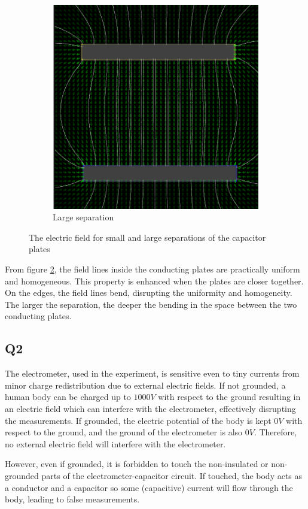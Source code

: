 \begin{figure}[H]
\begin{subfigure}{0.5\textwidth}
    \includegraphics[width=\linewidth]{capacitors/img/large_sep.png}
    \caption{Large separation} \label{prep_answers:fig:q1:large_sep}
  \end{subfigure}
  
  \caption{The electric field for small and large separations of the capacitor plates}
  \label{prep_answers:fig:q1}
\end{figure}

From figure \ref{prep_answers:fig:q1}, the field lines inside the conducting plates are practically uniform and homogeneous. This property is enhanced when the plates are closer together. On the edges, the field lines bend, disrupting the uniformity and homogeneity. The larger the separation, the deeper the bending in the space between the two conducting plates.

\subsection{Q2}

The electrometer, used in the experiment, is sensitive even to tiny currents from minor charge redistribution due to external electric fields. If not grounded, a human body can be charged up to $1000V$ with respect to the ground resulting in an electric field which can interfere with the electrometer, effectively disrupting the measurements. If grounded, the electric potential of the body is kept $0V$ with respect to the ground, and the ground of the electrometer is also $0V$. Therefore, no external electric field will interfere with the electrometer.

However, even if grounded, it is forbidden to touch the non-insulated or non-grounded parts of the electrometer-capacitor circuit. If touched, the body acts as a conductor and a capacitor so some (capacitive) current will flow through the body, leading to false measurements.
